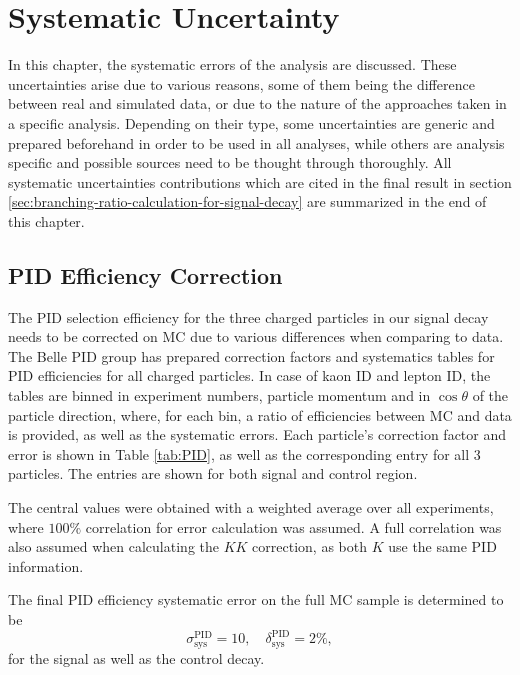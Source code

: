 \chapter{Systematic Uncertainty}\label{sec:systematic-uncertainty}
In this chapter, the systematic errors of the analysis are discussed. These uncertainties arise due to various reasons, some of them being the difference between real and simulated data, or due to the nature of the approaches taken in a specific analysis. Depending on their type, some uncertainties are generic and prepared beforehand in order to be used in all analyses, while others are analysis specific and possible sources need to be thought through thoroughly. All systematic uncertainties contributions which are cited in the final result in section \ref{sec:branching-ratio-calculation-for-signal-decay} are summarized in the end of this chapter.

\section{PID Efficiency Correction}\label{sec:pid-efficiency-correction}

The PID selection efficiency for the three charged particles in our signal decay needs to be corrected on MC due to various differences when comparing to data. The Belle PID group has prepared correction factors and systematics tables for PID efficiencies for all charged particles. In case of kaon ID and lepton ID, the tables are binned in experiment numbers, particle momentum and in $\cos\theta$ of the particle direction, where, for each bin, a ratio of efficiencies between MC and data is provided, as well as the systematic errors. Each particle's correction factor and error is shown in Table \ref{tab:PID}, as well as the corresponding entry for all 3 particles. The entries are shown for both signal and control region.

The central values were obtained with a weighted average over all experiments, where $100\%$ correlation for error calculation was assumed. A full correlation was also assumed when calculating the $KK$ correction, as both $K$ use the same PID information.

The final PID efficiency systematic error on the full MC sample is determined to be
\begin{equation}
\sigma_{\mathrm{sys}}^{\mathrm{PID}} = 10,\quad \delta_{\mathrm{sys}}^{\mathrm{PID}} = 2\%,
\end{equation}
for the signal as well as the control decay.

